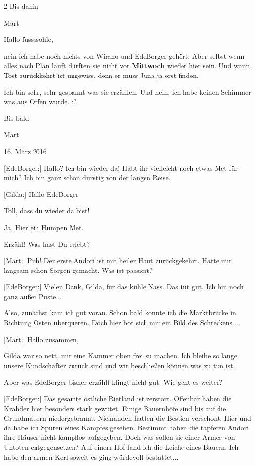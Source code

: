 \documentclass[10pt, a4paper, oneside]{book}
\begin{document}
\begin{multicols}{2}
Bis dahin

Mart


Hallo fussssohle,

nein ich habe noch nichts von Wirano und EdeBorger gehört. Aber selbst wenn alles nach Plan läuft dürften sie nicht vor \textbf{Mittwoch} wieder hier sein. Und wann Tost zurückkehrt ist ungewiss, denn er muss Juna ja erst finden.

Ich bin sehr, sehr gespannt was sie erzählen. Und nein, ich habe keinen Schimmer was aus Orfen wurde. :?

Bis bald

Mart

\begin{center}
    16. März 2016
\end{center}

[EdeBorger:] Hallo? Ich bin wieder da! Habt ihr vielleicht noch etwas Met für mich? Ich bin ganz schön durstig von der langen Reise.

[Gilda:] Hallo EdeBorger

Toll, dass du wieder da bist!

Ja, Hier ein Humpen Met.

Erzähl! Was hast Du erlebt?

[Mart:] Puh! Der erste Andori ist mit heiler Haut zurückgekehrt. Hatte mir langsam schon Sorgen gemacht. Was ist passiert?

[EdeBorger:] Vielen Dank, Gilda, für das kühle Nass. Das tut gut. Ich bin noch ganz außer Puste...

Also, zunächst kam ich gut voran. Schon bald konnte ich die Marktbrücke in Richtung Osten überqueren. Doch hier bot sich mir ein Bild des Schreckens....

[Mart:] Hallo zusammen,

Gilda war so nett, mir eine Kammer oben frei zu machen. Ich bleibe so lange unsere Kundschafter zurück sind und wir beschließen können was zu tun ist.

Aber was EdeBorger bisher erzählt klingt nicht gut. Wie geht es weiter?

[EdeBorger:] Das gesamte östliche Rietland ist zerstört. Offenbar haben die Krahder hier besonders stark gewütet. Einige Bauernhöfe sind bis auf die Grundmauern niedergebrannt. Niemanden hatten die Bestien verschont. Hier und da habe ich Spuren eines Kampfes gesehen. Bestimmt haben die tapferen Andori ihre Häuser nicht kampflos aufgegeben. Doch was sollen sie einer Armee von Untoten entgegensetzen? Auf einem Hof fand ich die Leiche eines Bauern. Ich habe den armen Kerl soweit es ging würdevoll bestattet...


\end{multicols}
\end{document}
